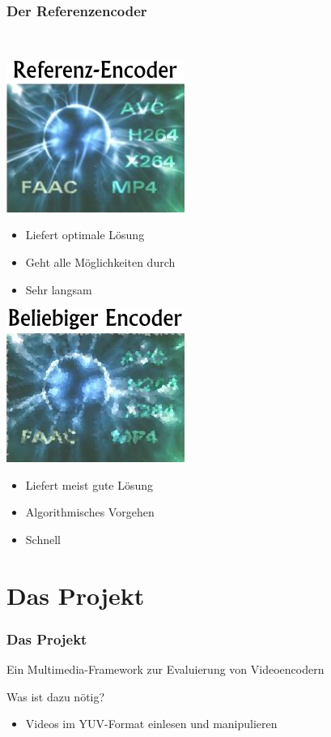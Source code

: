 \documentclass[t]{beamer}
\begin{document}
\begin{frame}
	\frametitle{Der Referenzencoder}
	~\\
	\begin{minipage}{5.3cm}
		\includegraphics[scale=.5]{ref.png}
		~\\
		\begin{itemize}
			\item<2-> Liefert optimale Lösung
			\item<4-> Geht alle Möglichkeiten durch
			\item<5-> Sehr langsam
		\end{itemize}
	\end{minipage}
	\hfill	
	\begin{minipage}{4.7cm}
		\includegraphics[scale=.5]{beliebig.png}
		~\\
		\begin{itemize}
			\item<3-> Liefert meist gute Lösung
			\item<6-> Algorithmisches Vorgehen
			\item<7-> Schnell
			
		\end{itemize}
	\end{minipage}
\end{frame}

\section{Das Projekt}
\begin{frame}
	\frametitle{Das Projekt}
	\begin{center}
		Ein Multimedia-Framework zur Evaluierung von Videoencodern	
	\end{center}
	 Was ist dazu nötig? \newline
	\begin{itemize}
		\item<3-> Videos im YUV-Format einlesen und manipulieren
	\end{itemize}
\end{frame}
\end{document}
